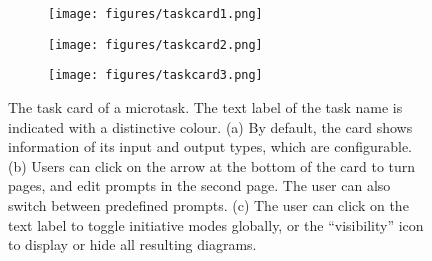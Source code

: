 \begin{figure}[t!]
\centering
\begin{subfigure}{.32\linewidth}
    \centering
    \texttt{[image: figures/taskcard1.png]}
    \label{fig:task_card_page1}
\end{subfigure}
\begin{subfigure}{.32\linewidth}
    \centering
    \texttt{[image: figures/taskcard2.png]}
    \label{fig:task_card_page2}
\end{subfigure}
\begin{subfigure}{.32\linewidth}
    \centering
    \texttt{[image: figures/taskcard3.png]}
    \label{fig:task_card_inactive}
\end{subfigure}
\caption{The task card of a microtask. The text label of the task name is indicated with a distinctive colour. (a) By default, the card shows information of 
its input and output types, which are configurable. (b) Users can click on the arrow at the bottom of the card to turn pages, and edit prompts in the second page. The user can also switch between predefined prompts. (c) The user can click on the text label to toggle initiative modes globally, or the ``visibility'' icon to display or hide all resulting diagrams.}
\label{fig:task_card}
\end{figure}



